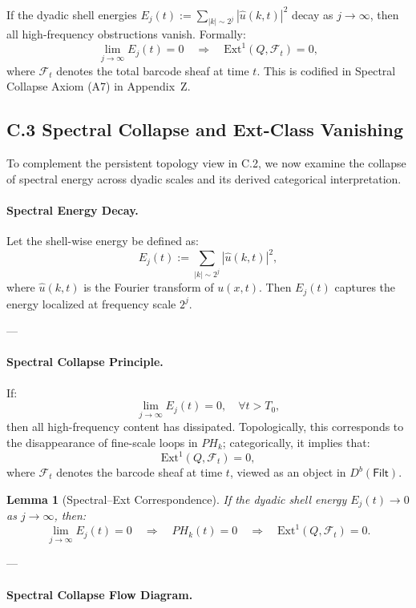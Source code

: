 \documentclass[11pt]{article}
\newtheorem{lemma}[theorem]{Lemma}
\begin{document}
If the dyadic shell energies \( E_j(t) := \sum_{|k| \sim 2^j} |\widehat{u}(k,t)|^2 \) decay as \( j \to \infty \),  
then all high-frequency obstructions vanish. Formally:
\[
\lim_{j \to \infty} E_j(t) = 0 
\quad \Rightarrow \quad 
\mathrm{Ext}^1(Q, \mathcal{F}_t) = 0,
\]
where \( \mathcal{F}_t \) denotes the total barcode sheaf at time \( t \).  
This is codified in Spectral Collapse Axiom (A7) in Appendix~Z.



\subsection*{C.3 Spectral Collapse and Ext-Class Vanishing}

To complement the persistent topology view in C.2, we now examine the collapse of spectral energy across dyadic scales and its derived categorical interpretation.

\paragraph{Spectral Energy Decay.}
Let the shell-wise energy be defined as:
\[
E_j(t) := \sum_{|k| \sim 2^j} |\widehat{u}(k,t)|^2,
\]
where \( \widehat{u}(k,t) \) is the Fourier transform of \( u(x,t) \).  
Then \( E_j(t) \) captures the energy localized at frequency scale \( 2^j \).  

---

\paragraph{Spectral Collapse Principle.}
If:
\[
\lim_{j \to \infty} E_j(t) = 0, \quad \forall t > T_0,
\]
then all high-frequency content has dissipated.  
Topologically, this corresponds to the disappearance of fine-scale loops in \( PH_k \);  
categorically, it implies that:
\[
\mathrm{Ext}^1(Q, \mathcal{F}_t) = 0,
\]
where \( \mathcal{F}_t \) denotes the barcode sheaf at time \( t \), viewed as an object in \( D^b(\mathsf{Filt}) \).

\begin{lemma}[Spectral–Ext Correspondence]
If the dyadic shell energy \( E_j(t) \to 0 \) as \( j \to \infty \), then:
\[
\lim_{j \to \infty} E_j(t) = 0 
\quad \Rightarrow \quad 
PH_k(t) = 0 
\quad \Rightarrow \quad 
\mathrm{Ext}^1(Q, \mathcal{F}_t) = 0.
\]
\end{lemma}

---

\paragraph{Spectral Collapse Flow Diagram.}
\end{document}
